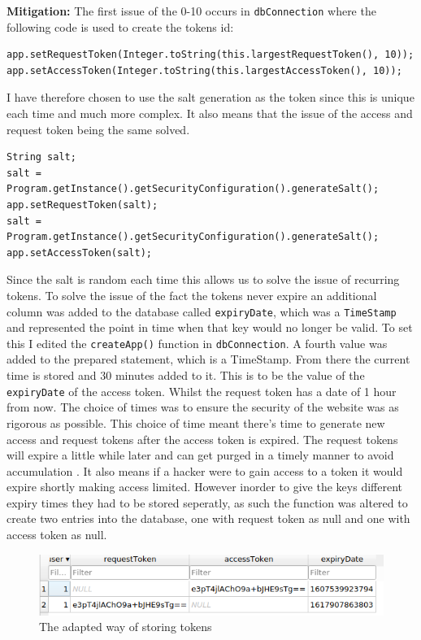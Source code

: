\textbf{Mitigation:} The first issue of the 0-10 occurs in \verb|dbConnection| where the following code is used to create the tokens id:\\
\begin{verbatim}
app.setRequestToken(Integer.toString(this.largestRequestToken(), 10));
app.setAccessToken(Integer.toString(this.largestAccessToken(), 10));
\end{verbatim}
I have therefore chosen to use the salt generation as the token since this is unique each time and much more complex. It also means that the issue of the access and request token
being the same solved.
\begin{verbatim}
String salt;
salt = Program.getInstance().getSecurityConfiguration().generateSalt();
app.setRequestToken(salt);
salt = Program.getInstance().getSecurityConfiguration().generateSalt();
app.setAccessToken(salt);
\end{verbatim}
Since the salt is random each time this allows us to solve the issue of recurring tokens. To solve the issue of the fact the tokens never expire an additional column was added to
the database called \verb|expiryDate|, which was a \verb|TimeStamp| and represented the point in time when that key would no longer be valid. To set this I edited the
\verb|createApp()| function in \verb|dbConnection|. A fourth value was added to the prepared statement, which is a TimeStamp. From there the current time is stored and 30 minutes
added to it. This is to be the value of the \verb|expiryDate| of the access token. Whilst the request token has a date of 1 hour from now. The choice of times was to ensure the security
of the website was as rigorous as possible. This choice of time meant there's time to generate new access and request tokens after the access token is expired.
The request tokens will expire a little while later and can get purged in a timely manner to avoid accumulation \cite{tokens}. It also means if a hacker were to gain access to a token
it would expire shortly making access limited. However inorder to give the keys different expiry times they had to be stored seperatly, as such the function was altered to create
two entries into the database, one with request token as null and one with access token as null.
\begin{figure}[h]
    \centering
    \includegraphics[width=1\textwidth]{figs/token2.png}
    \caption{The adapted way of storing tokens}
    \label{7.2}
\end{figure}\\
